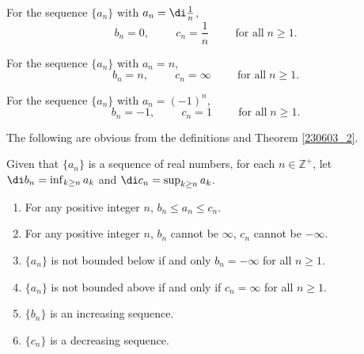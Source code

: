 \begin{example}[label=ex230226_1]{}
For the sequence $\{a_n\}$ with $a_n=\di\frac{1}{n}$,
\[b_n=0,\hspace{1cm} c_n=\frac{1}{n}\hspace{1cm}\text{for all}\;n\geq 1.\]

\end{example}

\begin{example}[label=ex230226_2]{}
For the sequence $\{a_n\}$ with $a_n=n$,
\[b_n=n,\hspace{1cm} c_n=\infty\hspace{1cm}\text{for all}\;n\geq 1.\]

\end{example}

\begin{example}[label=ex230226_3]{}
For the sequence $\{a_n\}$ with $a_n=(-1)^n$,
\[b_n=-1,\hspace{1cm} c_n=1\hspace{1cm}\text{for all}\;n\geq 1.\]

\end{example}
The following are obvious from the definitions and Theorem \ref{230603_2}.
\begin{proposition}[label=230603_1]{}
Given that $\{a_n\}$ is a sequence of real numbers, for each $n\in\mathbb{Z}^+$, let $\di b_n=\inf_{k\geq n}a_k$ and $\di c_n=\sup_{k\geq n}a_k$.  
\begin{enumerate}[1.]
\item For any positive integer $n$,  $b_n\leq a_n\leq c_n$.
\item  For any positive integer $n$,  $b_n$ cannot be $\infty$, $c_n$ cannot be $-\infty$.
\item $\{a_n\}$ is not bounded below if and only    $b_n=-\infty$ for all $n\geq 1$.
\item $\{a_n\}$ is not bounded above if and only if   $c_n=\infty$ for all $n\geq 1$.
 
\item $\{b_n\}$ is an increasing sequence.
\item $\{c_n\}$ is a decreasing sequence.   
\end{enumerate}
\end{proposition}

 

